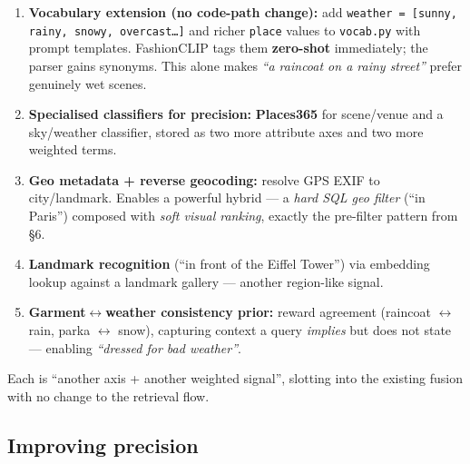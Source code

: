 \documentclass[10pt,a4paper]{article}
\newcommand{\tcode}[1]{\texttt{\small #1}}
\begin{document}
\begin{enumerate}
  \item \textbf{Vocabulary extension (no code-path change):} add
  \tcode{weather = [sunny, rainy, snowy, overcast\ldots]} and richer \tcode{place} values to
  \tcode{vocab.py} with prompt templates. FashionCLIP tags them \textbf{zero-shot} immediately; the
  parser gains synonyms. This alone makes \emph{``a raincoat on a rainy street''} prefer genuinely
  wet scenes.
  \item \textbf{Specialised classifiers for precision:} \textbf{Places365} for scene/venue and a
  sky/weather classifier, stored as two more attribute axes and two more weighted terms.
  \item \textbf{Geo metadata + reverse geocoding:} resolve GPS EXIF to city/landmark. Enables a
  powerful hybrid --- a \emph{hard SQL geo filter} (``in Paris'') composed with \emph{soft visual
  ranking}, exactly the pre-filter pattern from \S6.
  \item \textbf{Landmark recognition} (``in front of the Eiffel Tower'') via embedding lookup
  against a landmark gallery --- another region-like signal.
  \item \textbf{Garment$\leftrightarrow$weather consistency prior:} reward agreement (raincoat
  $\leftrightarrow$ rain, parka $\leftrightarrow$ snow), capturing context a query \emph{implies}
  but does not state --- enabling \emph{``dressed for bad weather''}.
\end{enumerate}

Each is ``another axis + another weighted signal'', slotting into the existing fusion with no change
to the retrieval flow.

\subsection{Improving precision}
\end{document}
